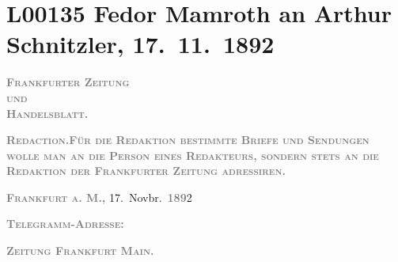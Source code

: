 

\section[Fedor Mamroth an Arthur Schnitzler, 17. 11. 1892]{L00135 Fedor Mamroth an Arthur Schnitzler, 17. 11. 1892}
\nopagebreak{}
\rehead{ }\normalsize\beginnumbering{}
\toendnotes[C]{\smallbreak\pagebreak[2]}
\toendnotes[C]{\smallbreak}
\pstart
           {\pb}\textcolor{gray}{\textbf{\textsc{Frankfurter Zeitung}}}{\\}\textsc{\textcolor{gray}{\textbf{und}}}{\\}\textcolor{gray}{\textbf{\textsc{Handelsblatt.}}}\pend
           
\pstart
           
\pstart
           \textcolor{gray}{\textbf{\textsc{Redaction.\noindent{}\textcolor{gray}{\textbf{\textsc{Für die Redaktion bestimmte Briefe und Sendungen wolle
                          man  an die Person eines Redakteurs,
                          sondern stets \textbf{an die Redaktion der Frankfurter
                            Zeitung} adressiren}}}.}}}\pend
           
\pstart
           \raggedleft{}\textcolor{gray}{\textbf{\textsc{Frankfurt a. M.,}}}{ }17. Novbr. \textsc{\textcolor{gray}{\textbf{189}}}2\pend
           \pend
           
\pstart
           \textcolor{gray}{\textbf{\textsc{Telegramm-Adresse:}}}\pend
           
\pstart
           \textcolor{gray}{\textbf{\textsc{Zeitung Frankfurt Main.}}}\pend
           
